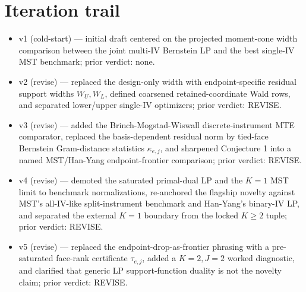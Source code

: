 \documentclass[11pt]{article}
\theoremstyle{definition}
\theoremstyle{plain}
\theoremstyle{remark}
\begin{document}
\section{Iteration trail}
\begin{itemize}[leftmargin=*]
\item v1 (cold-start) --- initial draft centered on the projected
moment-cone width comparison between the joint multi-IV Bernstein LP and the
best single-IV MST benchmark; prior verdict: none.
\item v2 (revise) --- replaced the design-only width with endpoint-specific
residual support widths \(W_U,W_L\), defined coarsened retained-coordinate
Wald rows, and separated lower/upper single-IV optimizers; prior verdict:
REVISE.
\item v3 (revise) --- added the Brinch-Mogstad-Wiswall discrete-instrument
MTE comparator, replaced the basis-dependent residual norm by tied-face
Bernstein Gram-distance statistics \(\kappa_{e,j}\), and sharpened Conjecture
1 into a named MST/Han-Yang endpoint-frontier comparison; prior verdict:
REVISE.
\item v4 (revise) --- demoted the saturated primal-dual LP and the \(K=1\)
MST limit to benchmark normalizations, re-anchored the flagship novelty
against MST's all-IV-like split-instrument benchmark and Han-Yang's binary-IV
LP, and separated the external \(K=1\) boundary from the locked \(K\ge2\)
tuple; prior verdict: REVISE.
\item v5 (revise) --- replaced the endpoint-drop-as-frontier phrasing with a
pre-saturated face-rank certificate \(\tau_{e,j}\), added a \(K=2,J=2\)
worked diagnostic, and clarified that generic LP support-function duality is
not the novelty claim; prior verdict: REVISE.
\end{itemize}
\end{document}
